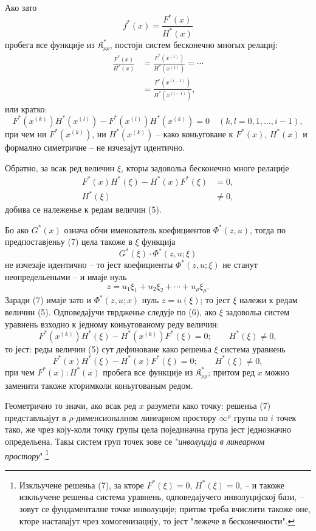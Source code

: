 ﻿\documentclass[11pt]{article}
\providecommand{\Kfield}{\mathfrak{K}}
\begin{document}
Ако зато
\[
  f^*(x)=\frac{F^*(x)}{H^*(x)}
\]
пробега все функције из $\Kfield^*_{\rho\rho}$, постоји систем бесконечно многых релациј:
\begin{equation}
\begin{aligned}
  \frac{F^*(x)}{H^*(x)}
  &=\frac{F^*(x^{(1)})}{H^*(x^{(1)})}=\cdots\\
  &=\frac{F^*(x^{(i-1)})}{H^*(x^{(i-1)})},
\end{aligned}
\tag{6}
\end{equation}
или кратко:
\[
  F^*(x^{(k)})H^*(x^{(l)})-
  F^*(x^{(l)})H^*(x^{(k)})=0
  \quad(k,l=0,1,\ldots,i-1),
\]
при чем ни $F^*(x^{(k)})$, ни $H^*(x^{(k)})$ -- како коньуговане к $F^*(x)$, $H^*(x)$ и формално симетричне -- не изчезајут идентично.

Обратно, за всак ред величин $\xi$, кторы задовольа бесконечно многе релације
\begin{equation}
\begin{aligned}
  F^*(x)H^*(\xi)-H^*(x)F^*(\xi)&=0,\\
  H^*(\xi)&\ne0,
\end{aligned}
\tag{7}
\end{equation}
добива се належенье к редам величин (5).

Бо ако $G^*(x)$ означа обчи именователь коефициентов $\Phi^*(z,u)$, тогда по предпоставјеньу (7) цела такоже в $\xi$ функција
\[
  G^*(\xi)\cdot\Phi^*(z,u;\xi)
\]
не изчезаје идентично -- то јест коефициенты $\Phi^*(z,u;\xi)$ не станут неопредельеными -- и имаје нуль
\[
  z=u_1\xi_1+u_2\xi_2+\cdots+u_\rho\xi_\rho.
\]
Заради (7) имаје зато и $\Phi^*(z,u;x)$ нуль $z=u(\xi)$; то јест $\xi$ належи к редам величин (5). Одповедајучи тврдженье следује по (6), ако $\xi$ задовольа систем уравнень взходно к једному коньугованому реду величин:
\[
  F^*(x^{(k)})H^*(\xi)-H^*(x^{(k)})F^*(\xi)=0;
  \qquad H^*(\xi)\ne0,
\]
то јест: реды величин (5) сут дефиноване како решеньа $\xi$ система уравнень
\[
  F^*(x)H^*(\xi)-H^*(x)F^*(\xi)=0;
  \qquad H^*(\xi)\ne0,
\]
при чем $F^*(x):H^*(x)$ пробега все функције из $\Kfield^*_{\rho\rho}$; притом ред $x$ можно заменити такоже кторимколи коньугованым редом.

Геометрично то значи, ако всак ред $x$ разумети како точку: решеньа (7) представльајут в $\rho$-дименсионалном линеарном простору $\infty^\rho$ групы по $i$ точек тако, же чрез коју-коли точку групы цела појединачна група јест једнозначно определьена. Такы систем груп точек зове се "{\itshape инволуција в линеарном простору}".\footnote{Изкльучене решеньа (7), за кторе $F^*(\xi)=0$, $H^*(\xi)=0$, -- и такоже изкльучене решеньа система уравнень, одповедајучего инволуцијској бази, -- зовут се фундаменталне точке инволуције; притом треба вчислити такоже оне, кторе наставајут чрез хомогенизацију, то јест "лежече в бесконечности".}
\end{document}
